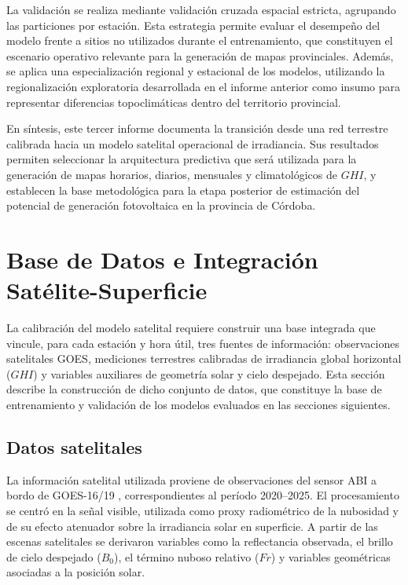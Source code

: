 \documentclass[../main.tex]{subfiles}
\begin{document}
La validación se realiza mediante validación cruzada espacial estricta, agrupando las particiones por estación. Esta estrategia permite evaluar el desempeño del modelo frente a sitios no utilizados durante el entrenamiento, que constituyen el escenario operativo relevante para la generación de mapas provinciales. Además, se aplica una especialización regional y estacional de los modelos, utilizando la regionalización exploratoria desarrollada en el informe anterior como insumo para representar diferencias topoclimáticas dentro del territorio provincial.

En síntesis, este tercer informe documenta la transición desde una red terrestre calibrada hacia un modelo satelital operacional de irradiancia. Sus resultados permiten seleccionar la arquitectura predictiva que será utilizada para la generación de mapas horarios, diarios, mensuales y climatológicos de $GHI$, y establecen la base metodológica para la etapa posterior de estimación del potencial de generación fotovoltaica en la provincia de Córdoba.


\newpage

\section{Base de Datos e Integración Satélite-Superficie}

La calibración del modelo satelital requiere construir una base integrada que vincule, para cada estación y hora útil, tres fuentes de información: observaciones satelitales GOES, mediciones terrestres calibradas de irradiancia global horizontal ($GHI$) y variables auxiliares de geometría solar y cielo despejado. Esta sección describe la construcción de dicho conjunto de datos, que constituye la base de entrenamiento y validación de los modelos evaluados en las secciones siguientes.

\subsection{Datos satelitales}

La información satelital utilizada proviene de observaciones del sensor ABI a bordo de GOES-16/19 \cite{schmit2017}, correspondientes al período 2020--2025. El procesamiento se centró en la señal visible, utilizada como proxy radiométrico de la nubosidad y de su efecto atenuador sobre la irradiancia solar en superficie. A partir de las escenas satelitales se derivaron variables como la reflectancia observada, el brillo de cielo despejado ($B_0$), el término nuboso relativo ($Fr$) y variables geométricas asociadas a la posición solar.
\end{document}
